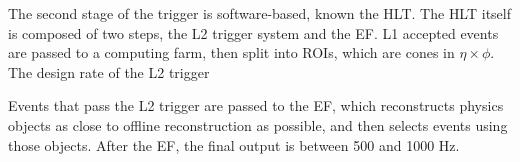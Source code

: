 The second stage of the trigger is software-based, known the \gls{HLT}. The \gls{HLT} itself is composed of two steps, the \gls{L2} trigger system and the \gls{EF}. \gls{L1} accepted events are passed to a computing farm, then split into \glspl{ROI}, which are cones in $\eta \times \phi$. The design rate of the \gls{L2} trigger 

Events that pass the \gls{L2} trigger are passed to the \gls{EF}, which reconstructs physics objects as close to offline reconstruction as possible, and then selects events using those objects. After the \gls{EF}, the final output is between 500 and 1000 Hz.

